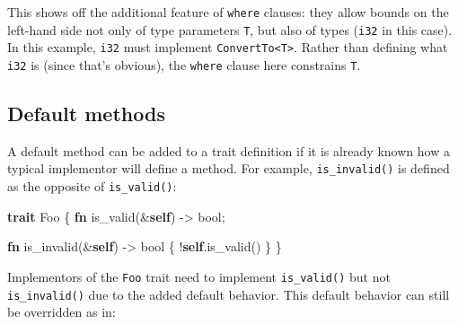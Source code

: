 \documentclass[a4paper,]{book}
\newenvironment{Shaded}{\begin{snugshade}}{\end{snugshade}}
\newcommand{\KeywordTok}[1]{\textcolor[rgb]{0.13,0.29,0.53}{\textbf{{#1}}}}
\newcommand{\DataTypeTok}[1]{\textcolor[rgb]{0.13,0.29,0.53}{{#1}}}
\newcommand{\NormalTok}[1]{{#1}}
\begin{document}
This shows off the additional feature of \texttt{where} clauses: they
allow bounds on the left-hand side not only of type parameters
\texttt{T}, but also of types (\texttt{i32} in this case). In this
example, \texttt{i32} must implement
\texttt{ConvertTo\textless{}T\textgreater{}}. Rather than defining what
\texttt{i32} is (since that's obvious), the \texttt{where} clause here
constrains \texttt{T}.

\subsection{Default methods}\label{default-methods}

A default method can be added to a trait definition if it is already
known how a typical implementor will define a method. For example,
\texttt{is\_invalid()} is defined as the opposite of
\texttt{is\_valid()}:

\begin{Shaded}
\begin{Highlighting}[]
\KeywordTok{trait} \NormalTok{Foo \{}
    \KeywordTok{fn} \NormalTok{is_valid(&}\KeywordTok{self}\NormalTok{) -> }\DataTypeTok{bool}\NormalTok{;}

    \KeywordTok{fn} \NormalTok{is_invalid(&}\KeywordTok{self}\NormalTok{) -> }\DataTypeTok{bool} \NormalTok{\{ !}\KeywordTok{self}\NormalTok{.is_valid() \}}
\NormalTok{\}}
\end{Highlighting}
\end{Shaded}

Implementors of the \texttt{Foo} trait need to implement
\texttt{is\_valid()} but not \texttt{is\_invalid()} due to the added
default behavior. This default behavior can still be overridden as in:
\end{document}
